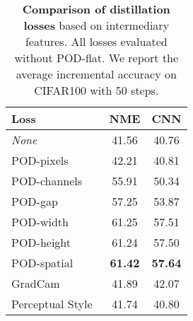 \begin{table*}[!htbp]
    \centering
    \begin{tabular}{@{}lcc@{}}
        \toprule
        Loss                                                        & NME            & CNN            \\
        \midrule
        \textit{None}                                               & 41.56          & 40.76          \\
        POD-pixels                                                  & 42.21          & 40.81          \\
        POD-channels                                                & 55.91          & 50.34          \\
        POD-gap                                                     & 57.25          & 53.87          \\
        POD-width                                                   & 61.25          & 57.51          \\
        POD-height                                                  & 61.24          & 57.50          \\
        POD-spatial                                                 & \textbf{61.42} & \textbf{57.64} \\
        \hdashline
        GradCam~\citep{dhar2019learning_without_memorizing_gradcam} & 41.89          & 42.07          \\
        Perceptual Style~\citep{johnson2016perceptual_losses}       & 41.74          & 40.80          \\
        \bottomrule
    \end{tabular}
    \caption{\textbf{Comparison of distillation losses} based on intermediary features. All losses evaluated
        without POD-flat. We report the average incremental accuracy on CIFAR100 with 50 steps.}
    \label{tab:podnet_ablation_perceptual_noflat}
\end{table*}
